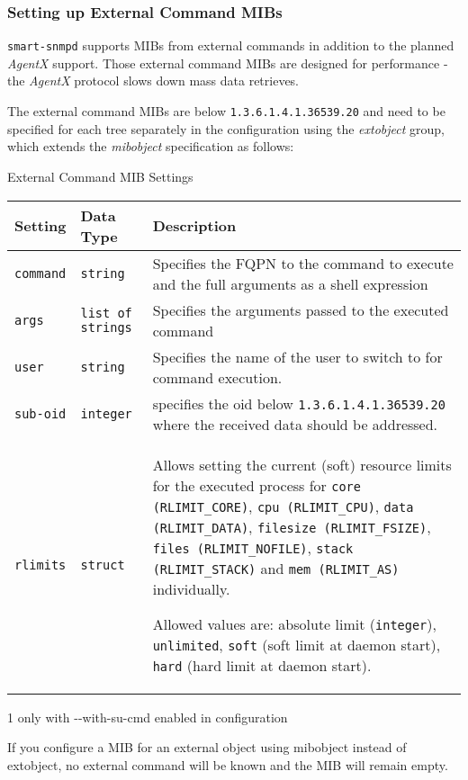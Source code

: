 \begin{minipage}{\textwidth}
\subsubsection{Setting up External Command MIBs}

\texttt{smart-snmpd} supports MIBs from external commands in addition to the
planned \emph{AgentX} support. Those external command MIBs are designed for
performance - the \emph{AgentX} protocol slows down mass data retrieves.

The external command MIBs are below \texttt{1.3.6.1.4.1.36539.20} and
need to be specified for each tree separately in the configuration using
the \emph{extobject} group, which extends the \emph{mibobject} specification
as follows:

\begin{threeparttable}
\caption{External Command MIB Settings}
\begin{tabularx}{\textwidth}{@{}*{2}{l}%
 >{\setlength\hsize{0.5\hsize}}X@{}
}
\hline
\textbf{Setting} & \textbf{Data Type} & \textbf{Description}\\
\hline
\texttt{command} & \texttt{string} & Specifies the FQPN to the command to
execute and the full arguments as a shell expression\\
\texttt{args} & \texttt{list of strings} & Specifies the arguments passed
to the executed command\\
\texttt{user\tnote{1}} & \texttt{string} & Specifies the name of the user to switch
to for command execution.\\
\texttt{sub-oid} & \texttt{integer} & specifies the oid below
\texttt{1.3.6.1.4.1.36539.20} where the received data should be addressed.\\
\texttt{rlimits} & \texttt{struct} & Allows setting the current (soft)
resource limits for the executed process for \texttt{core (RLIMIT\_CORE)},
\texttt{cpu (RLIMIT\_CPU)}, \texttt{data (RLIMIT\_DATA)},
\texttt{filesize (RLIMIT\_FSIZE)}, \texttt{files (RLIMIT\_NOFILE)},
\texttt{stack (RLIMIT\_STACK)} and \texttt{mem (RLIMIT\_AS)} individually.

Allowed values are: absolute limit (\texttt{integer}), \texttt{unlimited},
\texttt{soft} (soft limit at daemon start), \texttt{hard} (hard limit at daemon start).\\
\hline
\end{tabularx}
\begin{tablenotes}
\item[1] only with -\--with-su-cmd enabled in configuration
\end{tablenotes}
\end{threeparttable}

If you configure a MIB for an external object using mibobject instead of
extobject, no external command will be known and the MIB will remain
empty.
\end{minipage}

